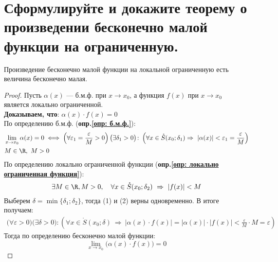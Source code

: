 \setcounter{equation}{0}
\section{Сформулируйте и докажите теорему о произведении бесконечно малой функции на ограниченную.}

\begin{theorem}
  Произведение бесконечно малой функции на локальной ограниченную есть величина бесконечно малая.
\end{theorem}
\begin{proof}
  Пусть $\alpha(x)$ --- б.м.ф. при $x \to x_0$, а функция $f(x)$ при $x \to  x_0$ является локально ограниченной.\\
  \textbf{Доказываем, что}: $\alpha(x) \cdot f(x) = 0$\\
  По определению б.м.ф. (\textbf{опр.\ref{опр: б.м.ф.}}): \vspace{-\topsep}
  \begin{gather}
    \begin{aligned}
      &\lim_{x \to x_0} \alpha(x) = 0 
      \iff \left(\forall \varepsilon_1 = \frac{\varepsilon}{M} > 0\right)\big(\exists \delta_1 > 0\big)\colon \left(\forall x \in \mathring{S}(x_0; \delta_1) \Rightarrow\ |\alpha(x)| < \varepsilon_1 = \frac{\varepsilon}{M}\right)\\
      &M \in \R,\ M > 0
    \end{aligned}
  \end{gather}
  По определению локально ограниченной функции (\textbf{опр.\ref{опр: локально ограниченная функция}}):
  \begin{gather} 
    \exists M \in \R, M > 0,\quad \forall x \in  \mathring{S}(x_0; \delta_2)\ \Rightarrow\ |f(x)| < M
  \end{gather}
  Выберем $\delta = \min \{\delta_1; \delta_2\} $, тогда (1) и (2) верны одновременно. В итоге получаем:
  \begin{gather*}
    \big(\forall \varepsilon > 0\big)\big(\exists \delta > 0\big)\colon \left(\forall x \in \mathring{S}(x_0; \delta)\ \Rightarrow\ |\alpha(x) \cdot f(x)| = |\alpha(x)| \cdot |f(x)| < \frac{\varepsilon}{M} \cdot M = \varepsilon \right)
  \end{gather*}
  Тогда по определению бесконечно малой функции:
  \[
  \lim_{x \to x_0} \big(\alpha(x) \cdot f(x)\big) = 0
  \] 
\end{proof}
\setcounter{equation}{0}

